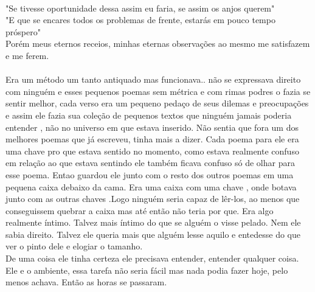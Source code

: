 \documentclass{book}
\begin{document}
\\
"Se tivesse oportunidade dessa assim eu faria, se assim os anjos querem"\\
"E que se encares todos os problemas de frente, estarás em pouco tempo próspero"\\
Porém meus eternos receios, minhas eternas observações ao mesmo me satisfazem e me ferem.
\\
\\
Era um método um tanto antiquado mas funcionava.. não se expressava direito com ninguém e esses pequenos poemas sem métrica e com rimas podres o fazia se sentir melhor, cada verso era um pequeno pedaço de seus dilemas e preocupações e assim ele fazia sua coleção de pequenos textos que ninguém jamais poderia entender , não no universo em que estava inserido. Não sentia que fora um dos melhores poemas que já escreveu, tinha mais a dizer. Cada poema para ele era uma chave pro que estava sentido no momento, como estava realmente confuso em relação ao que estava sentindo ele também ficava confuso só de olhar para esse poema. Entao guardou ele junto com o resto dos outros poemas em uma pequena caixa debaixo da cama. Era uma caixa com uma chave , onde botava junto com as outras chaves .Logo ninguém seria capaz de lêr-los, ao menos que conseguissem quebrar a caixa mas até então não teria por que. Era algo realmente íntimo. Talvez mais íntimo do que se alguém o visse pelado. Nem ele sabia direito. Talvez ele queria mais que alguém lesse aquilo e entedesse do que ver o pinto dele e elogiar o tamanho. \\
De uma coisa ele tinha certeza ele precisava entender, entender qualquer coisa. Ele e o ambiente, essa tarefa não seria fácil mas nada podia fazer hoje, pelo menos achava. Então as horas se passaram.
\end{document}
